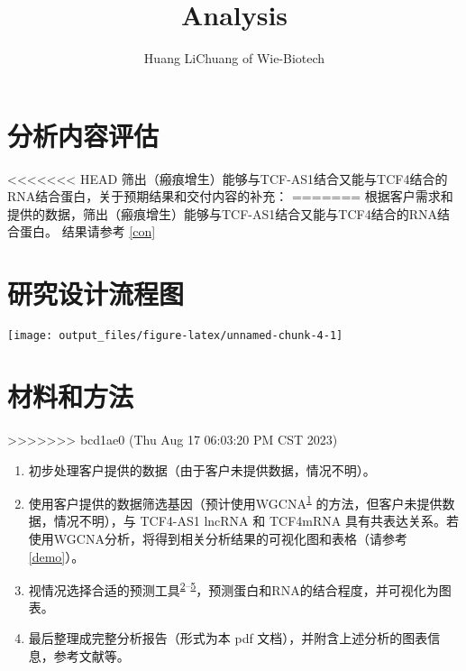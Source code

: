 \documentclass[
]{article}
\title{Analysis}
\author{Huang LiChuang of Wie-Biotech}
\date{}
\providecommand{\tightlist}{%
  \setlength{\itemsep}{0pt}\setlength{\parskip}{0pt}}
\begin{document}
\maketitle

{
\setcounter{tocdepth}{3}
\tableofcontents
}
\listoffigures

\listoftables

\hypertarget{ux5206ux6790ux5185ux5bb9ux8bc4ux4f30}{%
\section{分析内容评估}\label{ux5206ux6790ux5185ux5bb9ux8bc4ux4f30}}

<<<<<<< HEAD
筛出（瘢痕增生）能够与TCF-AS1结合又能与TCF4结合的RNA结合蛋白，关于预期结果和交付内容的补充：
=======
根据客户需求和提供的数据，筛出（瘢痕增生）能够与TCF-AS1结合又能与TCF4结合的RNA结合蛋白。
结果请参考 \ref{con}

\hypertarget{ux7814ux7a76ux8bbeux8ba1ux6d41ux7a0bux56fe}{%
\section{研究设计流程图}\label{ux7814ux7a76ux8bbeux8ba1ux6d41ux7a0bux56fe}}

\texttt{[image: output\_files/figure-latex/unnamed-chunk-4-1]}

\hypertarget{ux6750ux6599ux548cux65b9ux6cd5}{%
\section{材料和方法}\label{ux6750ux6599ux548cux65b9ux6cd5}}
>>>>>>> bcd1ae0 (Thu Aug 17 06:03:20 PM CST 2023)

\begin{enumerate}
\def\labelenumi{\arabic{enumi}.}
\tightlist
\item
  初步处理客户提供的数据（由于客户未提供数据，情况不明）。
\item
  使用客户提供的数据筛选基因（预计使用WGCNA\textsuperscript{\protect\hyperlink{ref-WgcnaAnRPacLangfe2008}{1}} 的方法，但客户未提供数据，情况不明），与 TCF4-AS1 lncRNA 和 TCF4mRNA 具有共表达关系。若使用WGCNA分析，将得到相关分析结果的可视化图和表格（请参考 \ref{demo}）。
\item
  视情况选择合适的预测工具\textsuperscript{\protect\hyperlink{ref-ICatIRapidArmaos2021}{2}--\protect\hyperlink{ref-RckAccurateAOrenst2016}{5}}，预测蛋白和RNA的结合程度，并可视化为图表。
\item
  最后整理成完整分析报告（形式为本 pdf 文档），并附含上述分析的图表信息，参考文献等。
\end{enumerate}
\end{document}
